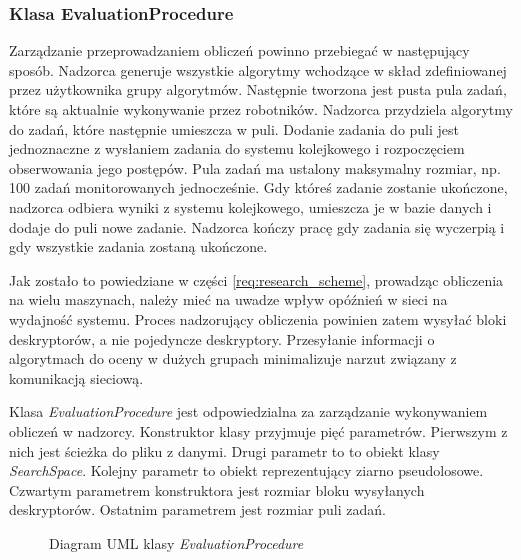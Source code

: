 \documentclass[../thesis.tex]{subfiles}
\begin{document}
\subsubsection{Klasa EvaluationProcedure}

Zarządzanie przeprowadzaniem obliczeń powinno przebiegać w następujący sposób. Nadzorca generuje wszystkie algorytmy wchodzące w skład zdefiniowanej przez użytkownika grupy algorytmów. Następnie tworzona jest pusta pula zadań, które są aktualnie wykonywanie przez robotników. Nadzorca przydziela algorytmy do zadań, które następnie umieszcza w puli. Dodanie zadania do puli jest jednoznaczne z wysłaniem zadania do systemu kolejkowego i rozpoczęciem obserwowania jego postępów. Pula zadań ma ustalony maksymalny rozmiar, np. 100 zadań monitorowanych jednocześnie. Gdy któreś zadanie zostanie ukończone, nadzorca odbiera wyniki z systemu kolejkowego, umieszcza je w bazie danych i dodaje do puli nowe zadanie. Nadzorca kończy pracę gdy zadania się wyczerpią i gdy wszystkie zadania zostaną ukończone.

Jak zostało to powiedziane w części \ref{req:research_scheme}, prowadząc obliczenia na wielu maszynach, należy mieć na uwadze wpływ opóźnień w sieci na wydajność systemu. Proces nadzorujący obliczenia powinien zatem wysyłać bloki deskryptorów, a nie pojedyncze deskryptory. Przesyłanie informacji o algorytmach do oceny w dużych grupach minimalizuje narzut związany z komunikacją sieciową. 

Klasa \emph{EvaluationProcedure} jest odpowiedzialna za zarządzanie wykonywaniem obliczeń w nadzorcy. Konstruktor klasy przyjmuje pięć parametrów. Pierwszym z nich jest ścieżka do pliku z danymi. Drugi parametr to to obiekt klasy \emph{SearchSpace}. Kolejny parametr to obiekt reprezentujący ziarno pseudolosowe. Czwartym parametrem konstruktora jest rozmiar bloku wysyłanych deskryptorów. Ostatnim parametrem jest rozmiar puli zadań.

\begin{figure}[h]
\centering
{}
\caption{Diagram UML klasy \emph{EvaluationProcedure}}
\label{proj:diagram_evaluation_procedure}
\end{figure}
\end{document}
